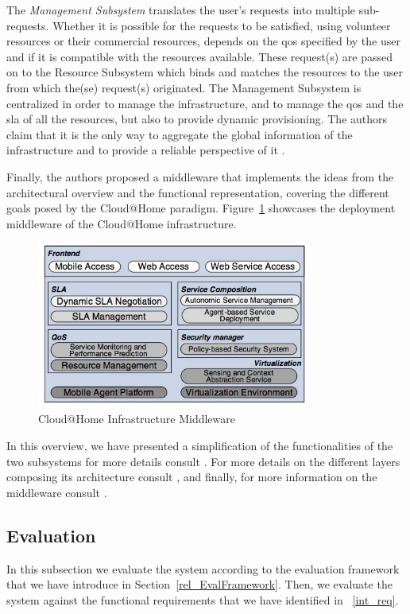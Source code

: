 \documentclass[12pt, titlepage]{uo_temp}
\begin{document}
     The \emph{Management Subsystem} translates the user's requests into multiple
     sub-requests. Whether it is possible for the requests to be satisfied, using
     volunteer resources or their commercial resources, depends on the \gls{qos} specified
     by the user and if it is compatible with the resources available. These request(s)
     are passed on to the Resource Subsystem which binds and matches the resources to the
     user from which the(se) request(s) originated. The Management Subsystem is
     centralized in order to manage the infrastructure, and to manage the \gls{qos} and
     the \gls{sla} of all the resources, but also to provide dynamic provisioning. The
     authors claim that it is the only way to aggregate the global information of the
     infrastructure and to provide a reliable perspective of it \cite{cunsolo2010open}.

     Finally, the authors proposed a middleware that implements the ideas from the
     architectural overview and the functional representation, covering the different
     goals posed by the Cloud@Home paradigm. Figure~\ref{cathome_infra} showcases the
     deployment middleware of the Cloud@Home infrastructure.
     
     \begin{figure}[h]
       \centering
       \includegraphics[width=90mm]{images/cathome_infra.jpg}
       \caption{Cloud@Home Infrastructure Middleware\label{cathome_infra} \cite{aversa2011cloud}}
     \end{figure}

     In this overview, we have presented a simplification of the functionalities of the
     two subsystems for more details consult \cite{cunsolo2010open}. For more details on
     the different layers composing its architecture consult \cite{aversa2011cloud}, and
     finally, for more information on the middleware consult \cite{cunsolo2010applying}.

     \subsection{Evaluation}
     In this subsection we evaluate the system according to the evaluation framework that
     we have introduce in Section~\ref{rel_EvalFramework}. Then, we evaluate the system
     against the functional requirements that we have identified in ~\ref{int_req}.
\end{document}
